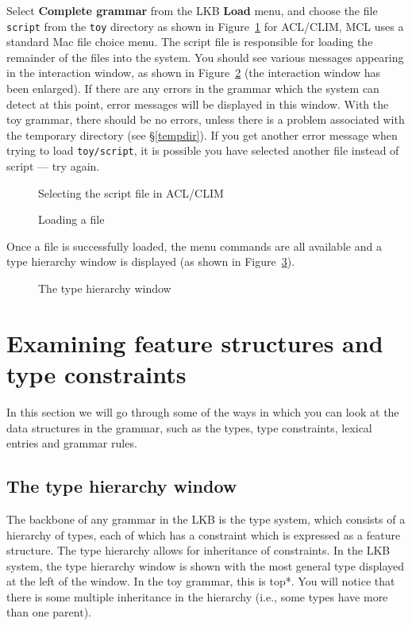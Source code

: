 \documentclass[12pt]{report}
\newcommand{\filename}[1]{{\tt #1}}
\newcommand{\lkbmenucommand}{\bf}
\begin{document}
Select {\lkbmenucommand Complete grammar} from the LKB {\lkbmenucommand Load}
menu, and choose the file \filename{script} from the \filename{toy} directory
as shown in Figure~\ref{loadscript} for ACL/CLIM, MCL uses a standard
Mac file choice menu.
The script file is responsible for
loading the remainder of the files into the system.  You should see various
messages appearing in the interaction window, as shown in
Figure~\ref{loadmess}
(the interaction window has been enlarged).  
If there are any errors in the grammar which the system
can detect at this point, error messages will be displayed in this window.
With the toy grammar, there should be no errors, unless there is a problem 
associated with the temporary directory (see \S\ref{tempdir}).
If
you get another error message when trying to load 
\filename{toy/script}, it is
possible you have selected another file instead of script --- try again.
\begin{figure}
\epsfxsize=3in
\caption{Selecting the script file in ACL/CLIM}
\label{loadscript}
\end{figure}
\begin{figure}
\caption{Loading a file}
\label{loadmess}
\end{figure}

Once a file is successfully loaded, the menu commands are all available
and a type hierarchy window is displayed (as shown in Figure~\ref{typehier}).
\begin{figure}
\epsfxsize=3in
\caption{The type hierarchy window}
\label{typehier}
\end{figure}


\section{Examining feature structures and type constraints}

In this section we will go through some of the ways in which
you can look at the data structures in the grammar, such as the types,
type constraints,
lexical entries and grammar rules.

\subsection{The type hierarchy window}
The backbone of any grammar in the LKB is the type system,
which consists of a hierarchy of types, each of which has a
constraint which is expressed as a feature structure.
The type hierarchy allows for inheritance of constraints.
In the LKB system, the type hierarchy window is shown 
with the most
general type displayed at the left of the window.  In the toy grammar, 
this is {\type *top*}.  
You will notice that there is some multiple inheritance in the hierarchy
(i.e., some types have more than one parent).
\end{document}
